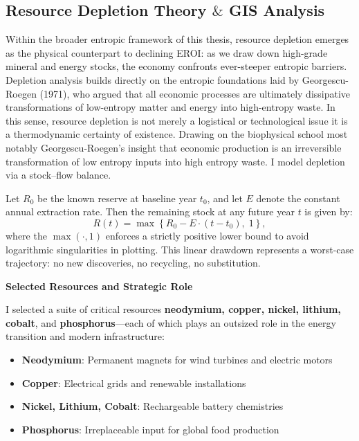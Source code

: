 \documentclass[a4paper,12pt]{article}
\begin{document}
\subsection{Resource Depletion Theory $\&$ GIS Analysis}
Within the broader entropic framework of this thesis, resource depletion emerges as the physical counterpart to declining EROI: as we draw down high-grade mineral and energy stocks, the economy confronts ever-steeper entropic barriers. Depletion analysis builds directly on the entropic foundations laid by Georgescu-Roegen (1971), who argued that all economic processes are ultimately dissipative transformations of low-entropy matter and energy into high-entropy waste. In this sense, resource depletion is not merely a logistical or technological issue it is a thermodynamic certainty of existence. Drawing on the biophysical school most notably Georgescu-Roegen’s insight that economic production is an irreversible transformation of low entropy inputs into high entropy waste. I model depletion via a stock–flow balance.

Let $R_{0}$ be the known reserve at baseline year $t_{0}$, and let $E$ denote the constant annual extraction rate. Then the remaining stock at any future year $t$ is given by:
\[
    R(t) = \max\left\{ R_{0} - E \cdot (t - t_{0}),\; 1 \right\},
\]
where the $\max(\cdot,1)$ enforces a strictly positive lower bound to avoid logarithmic singularities in plotting. This linear drawdown represents a worst-case trajectory: no new discoveries, no recycling, no substitution.

\vspace{1em}
\noindent\textbf{Selected Resources and Strategic Role}

\vspace{0.3em}
I selected a suite of critical resources \textbf{neodymium, copper, nickel, lithium, cobalt}, and \textbf{phosphorus}—each of which plays an outsized role in the energy transition and modern infrastructure:
\begin{itemize}
    \item \textbf{Neodymium}: Permanent magnets for wind turbines and electric motors
    \item \textbf{Copper}: Electrical grids and renewable installations
    \item \textbf{Nickel, Lithium, Cobalt}: Rechargeable battery chemistries
    \item \textbf{Phosphorus}: Irreplaceable input for global food production
\end{itemize}
\end{document}
